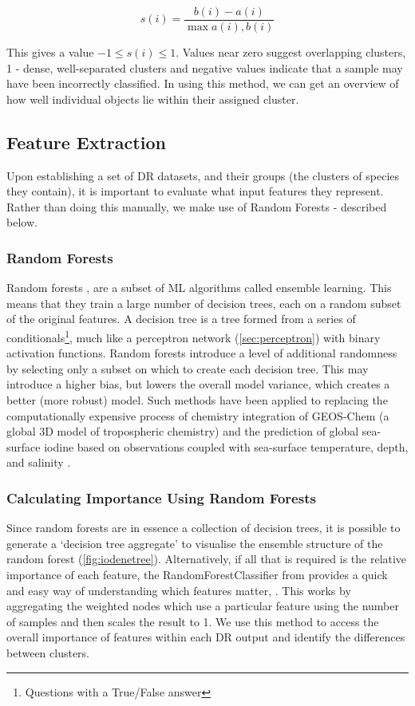 \begin{equation}
s(i) = \frac{b(i)-a(i)}{\max{ a(i), b(i)}}
\end{equation}

This gives a value $-1 \le s(i) \le 1$. Values near zero suggest overlapping clusters, 1 - dense, well-separated clusters and negative values indicate that a sample may have been incorrectly classified. In using this method, we can get an overview of how well individual objects lie within their assigned cluster.




\subsection{Feature Extraction}\label{sec:drfeature}
Upon establishing a set of DR datasets, and their groups (the clusters of species they contain), it is important to evaluate what input features they represent. Rather than doing this manually, we make use of Random Forests - described below.

\subsubsection{Random Forests}
Random forests \citep{rfrr}, are a subset of ML algorithms called ensemble learning. This means that they train a large number of decision trees, each on a random subset of the original features. A decision tree is a tree formed from a series of conditionals\footnote{Questions with a True/False answer}, much like a perceptron network (\autoref{sec:perceptron}) with binary activation functions. Random forests introduce a level of additional randomness by selecting only a subset on which to create each decision tree. This may introduce a higher bias, but lowers the overall model variance, which creates a better (more robust) model. Such methods have been applied to replacing the computationally expensive process of chemistry integration of GEOS-Chem (a global 3D model of tropospheric chemistry) \citep{geosrf} and the prediction of global sea-surface iodine based on observations coupled with sea-surface temperature, depth, and salinity \citep{iodene}.

\subsubsection{Calculating Importance Using Random Forests}
Since random forests are in essence a collection of decision trees, it is possible to generate a `decision tree aggregate' to visualise the ensemble structure of the random forest \citep{forrester} (\autoref{fig:iodenetree}). Alternatively, if all that is required is the relative importance of each feature, the RandomForestClassifier from \citep{sklearn} provides a quick and easy way of understanding which features matter,
\citep{handsonml}. This works by aggregating the weighted nodes which use a particular feature using the number of samples and then scales the result to 1. We use this method to access the overall importance of features within each DR output and identify the differences between clusters.


